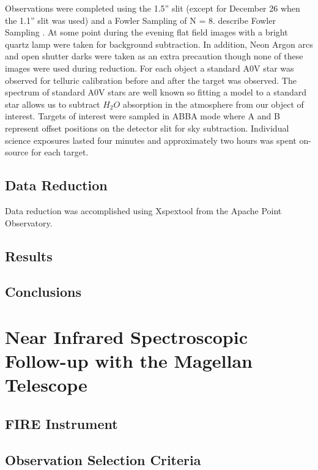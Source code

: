 \documentclass[preprint]{aastex}
\begin{document}
Observations were completed using the 1.5'' slit (except for December 26 when the 1.1'' slit was used) and a Fowler Sampling of N = 8. \color{red}  describe Fowler Sampling \color{black}. At some point during the evening flat field images with a bright quartz lamp were taken for background subtraction.  In addition, Neon Argon arcs and open shutter darks were taken as an extra precaution though none of these images were used during reduction.  For each object a standard A0V star was observed for telluric calibration before and after the target was observed.  The spectrum of standard A0V stars are well known so fitting a model to a standard star allows us to subtract $H_2O$ absorption in the atmosphere from our object of interest. Targets of interest were sampled in ABBA mode where A and B represent offset positions on the detector slit for sky subtraction.  Individual science exposures lasted four minutes and approximately two hours was spent on-source for each target.

\subsection{Data Reduction}

Data reduction was accomplished using Xspextool from the Apache Point Observatory. 

\subsection{Results}

\subsection{Conclusions}

\pagebreak

\section{Near Infrared Spectroscopic Follow-up with the Magellan Telescope}

\subsection{FIRE Instrument}

\subsection{Observation Selection Criteria}
\end{document}
